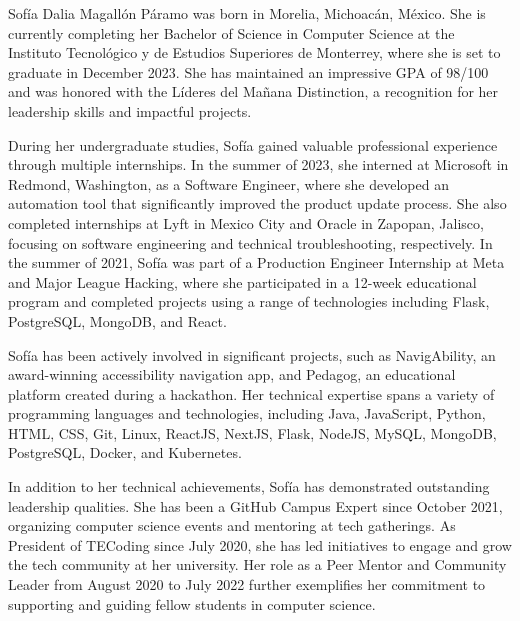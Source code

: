Sofía Dalia Magallón Páramo was born in Morelia, Michoacán, México. She is currently completing her Bachelor of Science in Computer Science at the Instituto Tecnológico y de Estudios Superiores de Monterrey, where she is set to graduate in December 2023. She has maintained an impressive GPA of 98/100 and was honored with the Líderes del Mañana Distinction, a recognition for her leadership skills and impactful projects.

During her undergraduate studies, Sofía gained valuable professional experience through multiple internships. In the summer of 2023, she interned at Microsoft in Redmond, Washington, as a Software Engineer, where she developed an automation tool that significantly improved the product update process. She also completed internships at Lyft in Mexico City and Oracle in Zapopan, Jalisco, focusing on software engineering and technical troubleshooting, respectively. In the summer of 2021, Sofía was part of a Production Engineer Internship at Meta and Major League Hacking, where she participated in a 12-week educational program and completed projects using a range of technologies including Flask, PostgreSQL, MongoDB, and React.

Sofía has been actively involved in significant projects, such as NavigAbility, an award-winning accessibility navigation app, and Pedagog, an educational platform created during a hackathon. Her technical expertise spans a variety of programming languages and technologies, including Java, JavaScript, Python, HTML, CSS, Git, Linux, ReactJS, NextJS, Flask, NodeJS, MySQL, MongoDB, PostgreSQL, Docker, and Kubernetes.

In addition to her technical achievements, Sofía has demonstrated outstanding leadership qualities. She has been a GitHub Campus Expert since October 2021, organizing computer science events and mentoring at tech gatherings. As President of TECoding since July 2020, she has led initiatives to engage and grow the tech community at her university. Her role as a Peer Mentor and Community Leader from August 2020 to July 2022 further exemplifies her commitment to supporting and guiding fellow students in computer science.